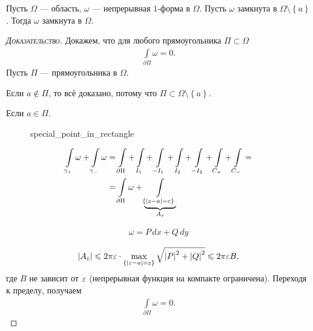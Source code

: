 \documentclass[../../main.tex]{subfiles}
\begin{document}
\begin{lm}
\label{lemma:ob_ustranenii_osobennosti}
 Пусть $\Omega$ --- область, $\omega$ --- непрерывная $1$-форма в $\Omega$. Пусть $\omega$ замкнута  в $\Omega \setminus \left\{ a \right\}$. Тогда $\omega$ замкнута в $\Omega$.
\end{lm}
\begin{proof}[\normalfont\textsc{Доказательство}]
 Докажем, что для любого прямоугольника $\Pi \subset \Omega$
 \begin{align*}
  \int\limits_{\partial\Pi} \omega = 0. 
 \end{align*} Пусть $\Pi$ --- прямоугольника в $\Omega$.

 Если $a \notin \Pi$, то всё доказано, потому что $\Pi \subset \Omega \setminus \left\{ a \right\}$.

 Если $a \in \Pi$.

\begin{figure}[ht]
    \centering
    \caption{special_point_in_rectangle}
    \label{fig:special_point_in_rectangle}
\end{figure}

\begin{align*}
 \int\limits_{\gamma_+}  \omega + \int\limits_{\gamma_-}  \omega &= \int\limits_{\partial\Pi} + \int\limits_{I_1}   + \int\limits_{-I_1}   + \int\limits_{I_2}  + \int\limits_{-I_2}   + \int\limits_{C_+}   + \int\limits_{C_-}   = \\
 &= \int\limits_{\partial\Pi} \omega + \underbrace{\int\limits_{\left\{ \left| z-a \right|=\varepsilon \right\}}   }_{A_{\varepsilon}}
\end{align*} 

\begin{align*}
 \omega = P\,dx + Q\,dy
\end{align*} 

\begin{align*}
 \left| A_{\varepsilon} \right| \leqslant 2\pi\varepsilon \cdot \max_{\left\{ \left| z-a \right|=\varepsilon \right\}} \sqrt{\left| P \right|^{2} + \left| Q \right|^{2}} \leqslant 2\pi\varepsilon B,
\end{align*} где $B$ не зависит от $\varepsilon$ (непрерывная функция на компакте ограничена). Переходя к пределу, получаем 
\begin{align*}
 \int\limits_{\partial\Pi}   \omega = 0.
\end{align*} 
 
\end{proof}
\end{document}
